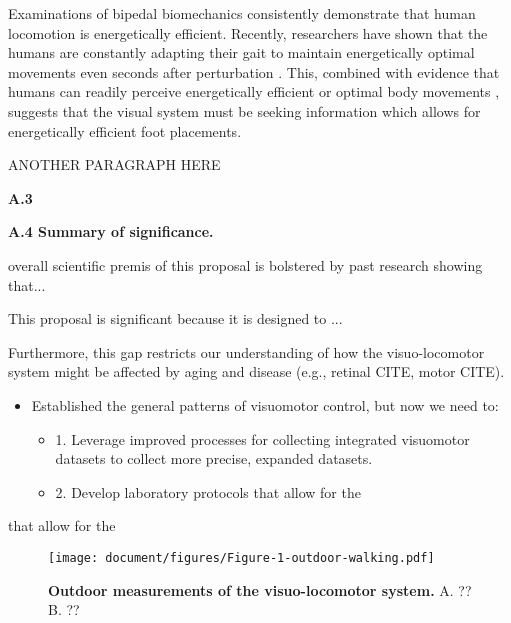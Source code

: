 Examinations of bipedal biomechanics consistently demonstrate that human locomotion is energetically efficient\cite{Kuo2002,Donelan2002}. Recently, researchers have shown that the humans are constantly adapting their gait to maintain energetically optimal movements even seconds after perturbation \cite{selinger2015}. This, combined with evidence that humans can readily perceive energetically efficient\cite{warren1984} or optimal body movements \cite{weast-knapp2019}, suggests that the visual system must be seeking information which allows for energetically efficient foot placements.

ANOTHER PARAGRAPH HERE


\textbf{A.3 } 


\textbf{A.4 Summary of significance.} 

overall scientific premis of this proposal is bolstered by past research showing that...

This proposal is significant because it is designed to ...


  Furthermore, this gap restricts our understanding of how the visuo-locomotor system might be affected by aging and disease (e.g., retinal CITE, motor CITE).  



\begin{itemize}
\item
  Established the general patterns of visuomotor control, but now we
  need to:

  \begin{itemize}
  \item
    1. Leverage improved processes for collecting integrated visuomotor
    datasets to collect more precise, expanded datasets.
  \item
    2. Develop laboratory protocols that allow for the
  \end{itemize}
\end{itemize}
that allow for the

\begin{figure}[h]
\centering
\texttt{[image: document/figures/Figure-1-outdoor-walking.pdf]}
\caption{\textbf{Outdoor measurements of the visuo-locomotor system.} A. ?? B. ??}
\end{figure}
